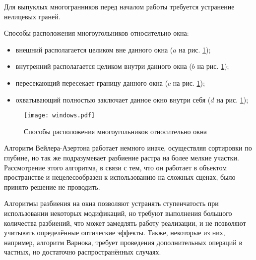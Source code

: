 Для выпуклых многогранников перед началом работы требуется устранение нелицевых граней.

Способы расположения многоугольников относительно окна:
\begin{itemize}
	\item внешний располагается целиком вне данного окна ($a$ на рис. \ref{img:windows});
	\item внутренний располагается целиком внутри данного окна ($b$ на рис. \ref{img:windows});
	\item пересекающий пересекает границу данного окна ($c$ на рис. \ref{img:windows});
	\item охватывающий полностью заключает данное окно внутри себя ($d$ на рис. \ref{img:windows});
\end{itemize}

\newpage

\begin{figure}[h!]
    \centering
    \texttt{[image: windows.pdf]}
    \caption{Способы расположения многоугольников относительно окна}
    \label{img:windows}
\end{figure}

Алгоритм Вейлера-Азертона работает немного иначе, осуществляя сортировки по глубине, но так же подразумевает разбиение растра на более мелкие участки. Рассмотрение этого алгоритма, в связи с тем, что он работает в объектом пространстве и нецелесообразен к использованию на сложных сценах, было принято решение не проводить.
%

Алгоритмы разбиения на окна позволяют устранять ступенчатость при использовании некоторых модификаций, но требуют выполнения большого количества разбиений, что может замедлять работу реализации, и не позволяют учитывать определённые оптические эффекты. Также, некоторые из них, например, алгоритм Варнока, требует проведения дополнительных операций в частных, но достаточно распространённых случаях.

